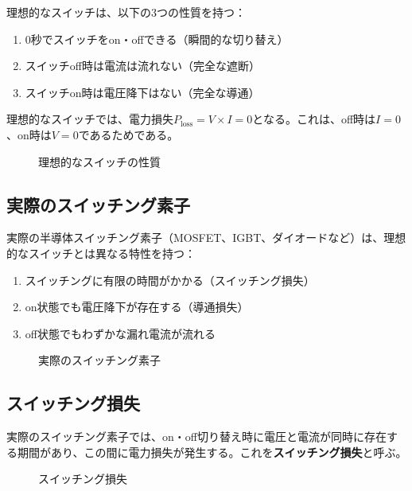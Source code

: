 理想的なスイッチは、以下の3つの性質を持つ：

\begin{enumerate}
\item 0秒でスイッチをon・offできる（瞬間的な切り替え）
\item スイッチoff時は電流は流れない（完全な遮断）
\item スイッチon時は電圧降下はない（完全な導通）
\end{enumerate}

理想的なスイッチでは、電力損失$P_{\text{loss}} = V \times I = 0$となる。これは、off時は$I = 0$、on時は$V = 0$であるためである。

\begin{figure}[H]
\centering
{}
\caption{理想的なスイッチの性質}
\label{fig:ideal_switch}
\end{figure}

\subsection{実際のスイッチング素子}

実際の半導体スイッチング素子（MOSFET、IGBT、ダイオードなど）は、理想的なスイッチとは異なる特性を持つ：

\begin{enumerate}
\item スイッチングに有限の時間がかかる（スイッチング損失）
\item on状態でも電圧降下が存在する（導通損失）
\item off状態でもわずかな漏れ電流が流れる
\end{enumerate}

\begin{figure}[H]
\centering
{}
\caption{実際のスイッチング素子}
\label{fig:real_switch}
\end{figure}

\subsection{スイッチング損失}

実際のスイッチング素子では、on・off切り替え時に電圧と電流が同時に存在する期間があり、この間に電力損失が発生する。これを\textbf{スイッチング損失}と呼ぶ。

\begin{figure}[H]
\centering
{}
\caption{スイッチング損失}
\label{fig:switching_loss}
\end{figure}

